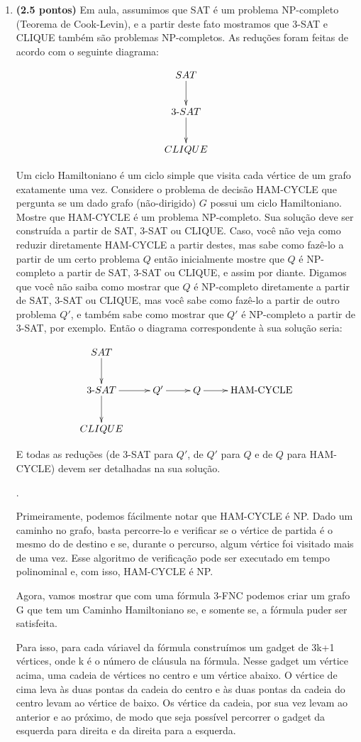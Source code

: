 \documentclass[12pt]{article}
\newcommand{\resposta}[1]{ \noindent {\bf Solução}.{\color{blue} #1}}
\begin{document}
\begin{enumerate}
\item {\bf (2.5 pontos)} Em aula, assumimos que SAT é um problema
  NP-completo (Teorema de Cook-Levin), e a partir deste fato mostramos
  que 3-SAT e CLIQUE também são problemas NP-completos. As reduções
  foram feitas de acordo com o seguinte diagrama:

  $$\xymatrix{
    SAT \ar[d] \\
    3\mbox{-}SAT \ar[d] \\
    CLIQUE 
  }$$
  
  Um ciclo Hamiltoniano é um ciclo simple que visita cada vértice de
  um grafo exatamente uma vez. Considere o problema de decisão
  HAM-CYCLE que pergunta se um dado grafo (não-dirigido) $G$ possui um
  ciclo Hamiltoniano. Mostre que HAM-CYCLE é um problema
  NP-completo. Sua solução deve ser construída a partir de SAT, 3-SAT
  ou CLIQUE. Caso, você não veja como reduzir diretamente HAM-CYCLE a
  partir destes, mas sabe como fazê-lo a partir de um certo problema
  $Q$ então inicialmente mostre que $Q$ é NP-completo a partir de SAT,
  3-SAT ou CLIQUE, e assim por diante. Digamos que você não saiba como
  mostrar que $Q$ é NP-completo diretamente a partir de SAT, 3-SAT ou
  CLIQUE, mas você sabe como fazê-lo a partir de outro problema $Q'$,
  e também sabe como mostrar que $Q'$ é NP-completo a partir de 3-SAT,
  por exemplo. Então o diagrama correspondente à sua solução seria:

  $$\xymatrix{
    SAT \ar[d] & & & \\
    3\mbox{-}SAT \ar[d]\ar[r] & Q' \ar[r] & Q \ar[r] & \mbox{HAM-CYCLE}  \\
    CLIQUE & & & 
  }$$

  E todas as reduções (de 3-SAT para $Q'$, de $Q'$ para $Q$ e de $Q$ para HAM-CYCLE) devem ser detalhadas na sua solução.

  \resposta{
    Primeiramente, podemos fácilmente notar que HAM-CYCLE é NP. Dado um
    caminho no grafo, basta percorre-lo e verificar se o vértice de partida
    é o mesmo do de destino e se, durante o percurso, algum vértice foi
    visitado mais de uma vez. Esse algoritmo de verificação pode ser
    executado em tempo polinominal e, com isso, HAM-CYCLE é NP.

    Agora, vamos mostrar que com uma fórmula 3-FNC podemos criar um
    grafo G que tem um Caminho Hamiltoniano se, e somente se, a fórmula
    puder ser satisfeita.

    Para isso, para cada váriavel da fórmula construímos um gadget de
    3k+1 vértices, onde k é o número de cláusula na fórmula. Nesse gadget
    um vértice acima, uma cadeia de vértices no centro e um vértice abaixo.
    O vértice de cima leva às duas pontas da cadeia do centro e às duas pontas
    da cadeia do centro levam ao vértice de baixo. Os vértice da cadeia, por
    sua vez levam ao anterior e ao próximo, de modo que seja possível percorrer
    o gadget da esquerda para direita e da direita para a esquerda.

}
\end{enumerate}
\end{document}
